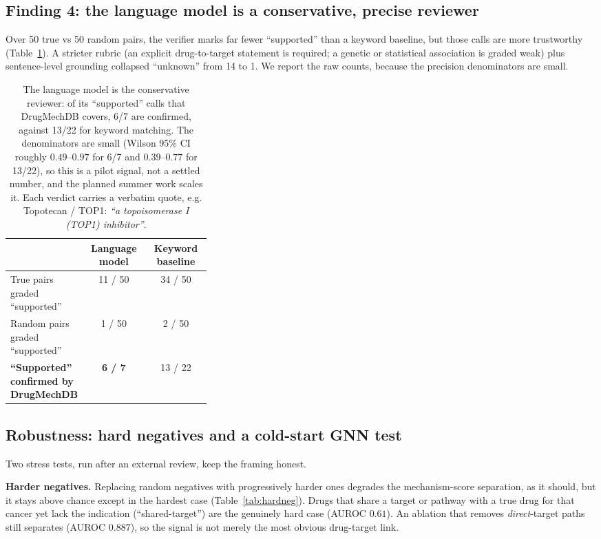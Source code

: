 \documentclass[11pt]{article}
\begin{document}
\subsection{Finding 4: the language model is a conservative, precise reviewer}
Over 50 true vs 50 random pairs, the verifier marks far fewer ``supported'' than a
keyword baseline, but those calls are more trustworthy (Table~\ref{tab:verify}). A
stricter rubric (an explicit drug-to-target statement is required; a genetic or
statistical association is graded weak) plus sentence-level grounding collapsed
``unknown'' from 14 to 1. We report the raw counts, because the precision
denominators are small.

\begin{table}[H]
\centering\small
\begin{tabular}{>{\raggedright\arraybackslash}p{0.34\linewidth} cc}
\toprule
\rowcolor{sriblue}\color{white}\textbf{} & \color{white}\textbf{Language model} & \color{white}\textbf{Keyword baseline}\\
\midrule
\rowcolor{srirow} True pairs graded ``supported'' & 11 / 50 & 34 / 50\\
Random pairs graded ``supported'' & 1 / 50 & 2 / 50\\
\rowcolor{srirow} \textbf{``Supported'' confirmed by DrugMechDB} & \textbf{6 / 7} & 13 / 22\\
\bottomrule
\end{tabular}
\caption{The language model is the conservative reviewer: of its ``supported''
calls that DrugMechDB covers, 6/7 are confirmed, against 13/22 for keyword matching.
The denominators are small (Wilson 95\% CI roughly $0.49$--$0.97$ for 6/7 and
$0.39$--$0.77$ for 13/22), so this is a pilot signal, not a settled number, and the
planned summer work scales it. Each verdict carries a verbatim quote, e.g.
Topotecan / TOP1: \emph{``a topoisomerase I (TOP1) inhibitor''}.}
\label{tab:verify}
\end{table}

\subsection{Robustness: hard negatives and a cold-start GNN test}
Two stress tests, run after an external review, keep the framing honest.

\textbf{Harder negatives.} Replacing random negatives with progressively harder
ones degrades the mechanism-score separation, as it should, but it stays above
chance except in the hardest case (Table~\ref{tab:hardneg}). Drugs that share a
target or pathway with a true drug for that cancer yet lack the indication
(``shared-target'') are the genuinely hard case (AUROC $0.61$). An ablation that
removes \emph{direct}-target paths still separates (AUROC $0.887$), so the signal
is not merely the most obvious drug-target link.
\end{document}
